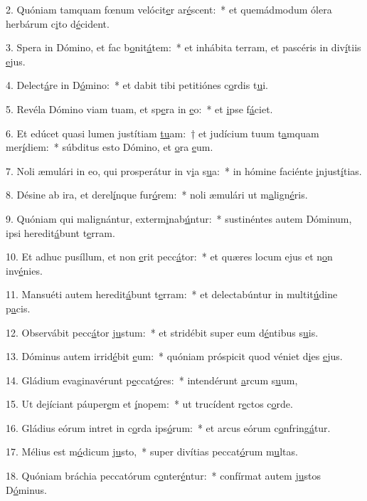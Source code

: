 2. Quóniam tamquam fœnum velócit\uline{e}r ar\uline{é}scent:~* et quemádmodum ólera herbárum c\uline{i}to d\uline{é}cident.\par 
3. Spera in Dómino, et fac b\uline{o}nit\uline{á}tem:~* et inhábita terram, et pascéris in div\uline{í}tiis \uline{e}jus.\par 
4. Delect\uline{á}re in D\uline{ó}mino:~* et dabit tibi petitiónes c\uline{o}rdis t\uline{u}i.\par 
5. Revéla Dómino viam tuam, et sp\uline{e}ra in \uline{e}o:~* et \uline{i}pse f\uline{á}ciet.\par 
6. Et edúcet quasi lumen justítiam \uline{tu}am:~† et judícium tuum t\uline{a}mquam mer\uline{í}diem:~* súbditus esto Dómino, et \uline{o}ra \uline{e}um.\par 
7. Noli æmulári in eo, qui prosperátur in v\uline{i}a s\uline{u}a:~* in hómine faciénte \uline{i}njust\uline{í}tias.\par 
8. Désine ab ira, et derel\uline{í}nque fur\uline{ó}rem:~* noli æmulári ut m\uline{a}lign\uline{é}ris.\par 
9. Quóniam qui malignántur, exterm\uline{i}nab\uline{ú}ntur:~* sustinéntes autem Dóminum, ipsi heredit\uline{á}bunt t\uline{e}rram.\par 
10. Et adhuc pusíllum, et non \uline{e}rit pecc\uline{á}tor:~* et quæres locum ejus et n\uline{o}n inv\uline{é}nies.\par 
11. Mansuéti autem heredit\uline{á}bunt t\uline{e}rram:~* et delectabúntur in multit\uline{ú}dine p\uline{a}cis.\par 
12. Observábit pecc\uline{á}tor j\uline{u}stum:~* et stridébit super eum d\uline{é}ntibus s\uline{u}is.\par 
13. Dóminus autem irrid\uline{é}bit \uline{e}um:~* quóniam próspicit quod véniet d\uline{i}es \uline{e}jus.\par 
14. Gládium evaginavérunt p\uline{e}ccat\uline{ó}res:~* intendérunt \uline{a}rcum s\uline{u}um,\par 
15. Ut dejíciant páuper\uline{e}m et \uline{í}nopem:~* ut trucídent r\uline{e}ctos c\uline{o}rde.\par 
16. Gládius eórum intret in c\uline{o}rda ips\uline{ó}rum:~* et arcus eórum c\uline{o}nfring\uline{á}tur.\par 
17. Mélius est m\uline{ó}dicum j\uline{u}sto,~* super divítias peccat\uline{ó}rum m\uline{u}ltas.\par 
18. Quóniam bráchia peccatórum c\uline{o}nter\uline{é}ntur:~* confírmat autem j\uline{u}stos D\uline{ó}minus.\par 
